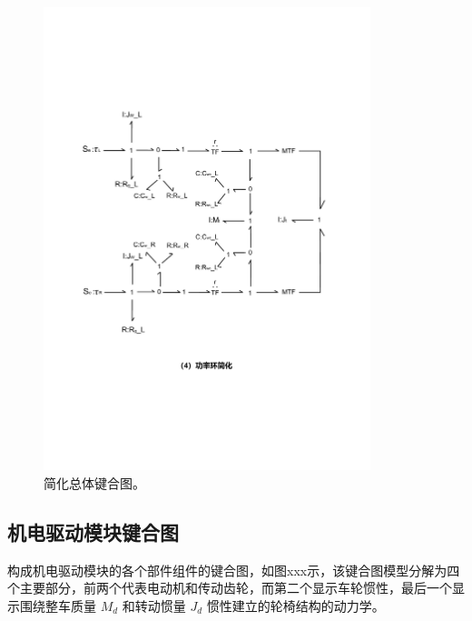 \begin{figure}[!h]
	\centering
	\includegraphics[width=0.85\textwidth]{fig/3_4_bond.pdf}
	\caption{简化总体键合图。}\label{fig:4_5_bond}
\end{figure}

\subsection{机电驱动模块键合图}

构成机电驱动模块的各个部件组件的键合图，如图xxx示，该键合图模型分解为四个主要部分，前两个代表电动机和传动齿轮，而第二个显示车轮惯性，最后一个显示围绕整车质量 $M_d$ 和转动惯量 $J_d$ 惯性建立的轮椅结构的动力学。

